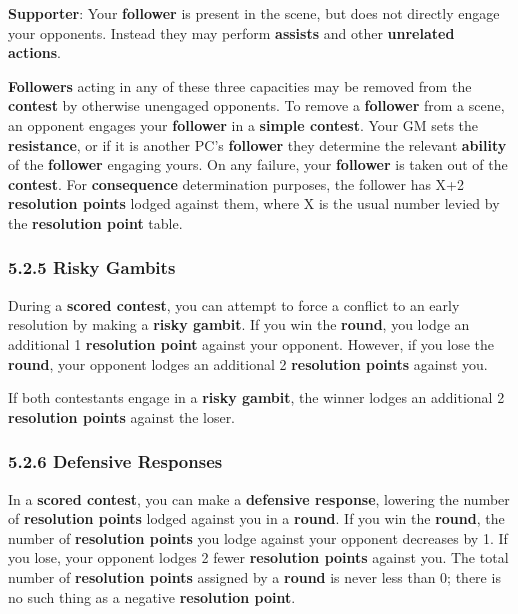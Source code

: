 \documentclass[
]{article}
\begin{document}
\textbf{Supporter}: Your \textbf{follower} is present in the scene, but
does not directly engage your opponents. Instead they may perform
\textbf{assists} and other \textbf{unrelated actions}.

\textbf{Followers} acting in any of these three capacities may be
removed from the \textbf{contest} by otherwise unengaged opponents. To
remove a \textbf{follower} from a scene, an opponent engages your
\textbf{follower} in a \textbf{simple contest}. Your GM sets the
\textbf{resistance}, or if it is another PC's \textbf{follower} they
determine the relevant \textbf{ability} of the \textbf{follower}
engaging yours. On any failure, your \textbf{follower} is taken out of
the \textbf{contest}. For \textbf{consequence} determination purposes,
the follower has X+2 \textbf{resolution points} lodged against them,
where X is the usual number levied by the \textbf{resolution point}
table.

\hypertarget{risky-gambits}{%
\subsubsection{5.2.5 Risky Gambits}\label{risky-gambits}}

During a \textbf{scored contest}, you can attempt to force a conflict to
an early resolution by making a \textbf{risky gambit}. If you win the
\textbf{round}, you lodge an additional 1 \textbf{resolution point}
against your opponent. However, if you lose the \textbf{round}, your
opponent lodges an additional 2 \textbf{resolution points} against you.

If both contestants engage in a \textbf{risky gambit}, the winner lodges
an additional 2 \textbf{resolution points} against the loser.

\hypertarget{defensive-responses}{%
\subsubsection{5.2.6 Defensive Responses}\label{defensive-responses}}

In a \textbf{scored contest}, you can make a \textbf{defensive
response}, lowering the number of \textbf{resolution points} lodged
against you in a \textbf{round}. If you win the \textbf{round}, the
number of \textbf{resolution points} you lodge against your opponent
decreases by 1. If you lose, your opponent lodges 2 fewer
\textbf{resolution points} against you. The total number of
\textbf{resolution points} assigned by a \textbf{round} is never less
than 0; there is no such thing as a negative \textbf{resolution point}.
\end{document}
